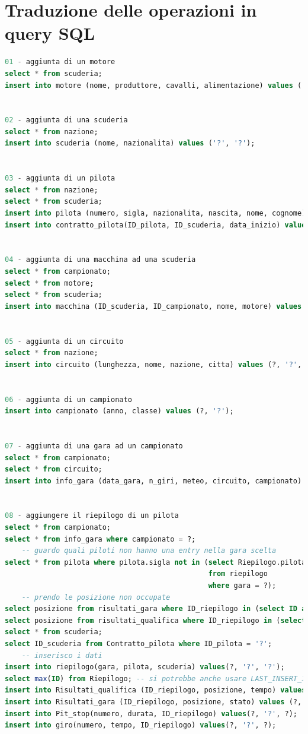 \documentclass[a4paper,12pt]{report}
\begin{document}
		\section{Traduzione delle operazioni in query SQL}
			\begin{lstlisting}[language=SQL]
01 - aggiunta di un motore
select * from scuderia;
insert into motore (nome, produttore, cavalli, alimentazione) values ('?', '?', ?, '?');


02 - aggiunta di una scuderia
select * from nazione;
insert into scuderia (nome, nazionalita) values ('?', '?');


03 - aggiunta di un pilota
select * from nazione;
select * from scuderia;
insert into pilota (numero, sigla, nazionalita, nascita, nome, cognome) value (?, '?', '?', '?', '?', '?');
insert into contratto_pilota(ID_pilota, ID_scuderia, data_inizio) values('?', '?', '?', ?);


04 - aggiunta di una macchina ad una scuderia
select * from campionato;
select * from motore;
select * from scuderia;
insert into macchina (ID_scuderia, ID_campionato, nome, motore) values ('?', ?, '?', '?');


05 - aggiunta di un circuito
select * from nazione;
insert into circuito (lunghezza, nome, nazione, citta) values (?, '?', '?', '?');


06 - aggiunta di un campionato
insert into campionato (anno, classe) values (?, '?');


07 - aggiunta di una gara ad un campionato
select * from campionato;
select * from circuito;
insert into info_gara (data_gara, n_giri, meteo, circuito, campionato) values ('?', ?, '?', '?', ?);


08 - aggiungere il riepilogo di un pilota
select * from campionato;
select * from info_gara where campionato = ?;
	-- guardo quali piloti non hanno una entry nella gara scelta
select * from pilota where pilota.sigla not in (select Riepilogo.pilota as numero 
											    from riepilogo 
											    where gara = ?);
	-- prendo le posizione non occupate
select posizione from risultati_gara where ID_riepilogo in (select ID as ID_riepilogo from riepilogo where gara = ?);
select posizione from risultati_qualifica where ID_riepilogo in (select ID as ID_riepilogo from riepilogo where gara = ?);										
select * from scuderia;
select ID_scuderia from Contratto_pilota where ID_pilota = '?';
	-- inserisco i dati
insert into riepilogo(gara, pilota, scuderia) values(?, '?', '?');
select max(ID) from Riepilogo; -- si potrebbe anche usare LAST_INSERT_ID() nei campi ID_riepilogo
insert into Risultati_qualifica (ID_riepilogo, posizione, tempo) values (?, ?, '?');
insert into Risultati_gara (ID_riepilogo, posizione, stato) values (?, ?, '?');
insert into Pit_stop(numero, durata, ID_riepilogo) values(?, '?', ?);	-- da eseguire per ongi pit stop
insert into giro(numero, tempo, ID_riepilogo) values(?, '?', ?);			-- da eseguire per ogni giro
	

\end{lstlisting}
\end{document}
